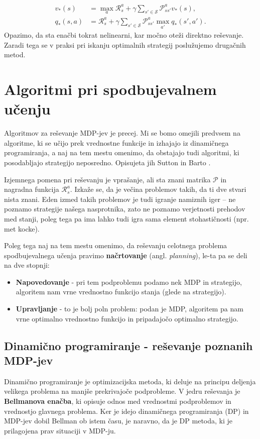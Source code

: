 \documentclass[12pt,a4paper]{amsart}
\theoremstyle{definition} %
\theoremstyle{plain} %
\begin{document}
\begin{align*}
    v_*(s) &= \max_a \mathcal{R}_s^a + \gamma \sum_{s' \in \mathcal{S}} \mathcal{P}_{ss'}^a v_*(s), \\
    q_*(s, a) &= \mathcal{R}_s^a + 
                \gamma \sum_{s' \in \mathcal{S}} \mathcal{P}_{ss'}^a \max_{a'} q_*(s', a').
\end{align*}
Opazimo, da sta enačbi tokrat nelinearni, kar močno oteži direktno reševanje. Zaradi tega se v praksi 
pri iskanju optimalnih strategij poslužujemo drugačnih metod.

\section{Algoritmi pri spodbujevalnem učenju}
\label{algoritmi}
Algoritmov za reševanje MDP-jev je precej. Mi se bomo omejili predvsem na algoritme, ki se učijo 
prek vrednostne funkcije in izhajajo iz dinamičnega programiranja, a naj na tem mestu omenimo, 
da obstajajo tudi algoritmi, ki posodabljajo strategijo neposredno. Opisujeta jih Sutton in Barto 
\cite{RLintro}.

Izjemnega pomena pri reševanju je vprašanje, ali sta znani matrika $\mathcal{P}$ in nagradna funkcija 
$\mathcal{R}_s^a$. Izkaže se, da je večina problemov takih, da ti dve stvari nista znani. Eden izmed 
takih problemov je tudi igranje namiznih iger -- ne poznamo strategije našega nasprotnika, zato ne 
poznamo verjetnosti prehodov med stanji, poleg tega pa ima lahko tudi igra sama element stohastičnosti 
(npr. met kocke).

Poleg tega naj na tem mestu omenimo, da reševanju celotnega problema spodbujevalnega učenja 
pravimo \textbf{načrtovanje} (angl. \textit{planning}), le-ta pa se deli na dve stopnji: 

\begin{itemize}
    \item \textbf{Napovedovanje} - pri tem podproblemu podamo nek MDP in strategijo, algoritem nam 
            vrne vrednostno funkcijo stanja (glede na strategijo).   
    \item \textbf{Upravljanje} - to je bolj poln problem: podan je MDP, algoritem pa nam vrne 
            optimalno vrednostno funkcijo in pripadajočo optimalno strategijo.
\end{itemize}

\subsection{Dinamično programiranje - reševanje poznanih MDP-jev}
Dinamično programiranje je optimizacijska metoda, ki deluje na principu deljenja velikega problema 
na manjše prekrivajoče podprobleme. V jedru reševanja je \textbf{Bellmanova enačba}, ki opisuje 
odnos med vrednostmi podproblemov in vrednostjo glavnega problema. Ker je idejo dinamičnega 
programiranja (DP) in MDP-jev dobil Bellman ob istem času, je naravno, da je DP metoda, ki je 
prilagojena prav situaciji v MDP-ju.
\end{document}
